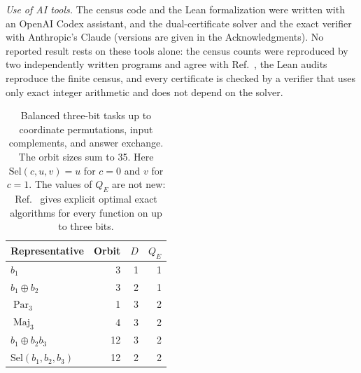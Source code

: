 \documentclass[
  aps,
  pra,
  reprint,
  nofootinbib
]{revtex4-2}
\begin{document}
\emph{Use of AI tools.} The census code and the Lean formalization were
written with an OpenAI Codex assistant, and the dual-certificate solver and
the exact verifier with Anthropic's Claude (versions are given in the
Acknowledgments). No
reported result rests on these tools alone: the census counts were reproduced
by two independently written programs and agree with
Ref.~\cite{MontanaroJozsaMitchison2015}, the Lean audits reproduce the finite
census, and every certificate is checked by a verifier that uses only exact
integer arithmetic and does not depend on the solver.

\begin{table}[t]
\caption{Balanced three-bit tasks up to coordinate permutations, input
complements, and answer exchange. The orbit sizes sum to 35. Here
\(\mathrm{Sel}(c,u,v)=u\) for \(c=0\) and \(v\) for \(c=1\). The values of
\(Q_E\) are not new: Ref.~\cite{MontanaroJozsaMitchison2015} gives explicit
optimal exact algorithms for every function on up to three bits.}
\label{tab:n3}
\begin{ruledtabular}
\begin{tabular}{lrrr}
Representative & Orbit & \(D\) & \(Q_E\)\\
\hline
\(b_1\) & 3 & 1 & 1\\
\(b_1\mathbin\oplus b_2\) & 3 & 2 & 1\\
\(\operatorname{Par}_3\) & 1 & 3 & 2\\
\(\operatorname{Maj}_3\) & 4 & 3 & 2\\
\(b_1\mathbin\oplus b_2b_3\) & 12 & 3 & 2\\
\(\mathrm{Sel}(b_1,b_2,b_3)\) & 12 & 2 & 2\\
\end{tabular}
\end{ruledtabular}
\end{table}
\end{document}
